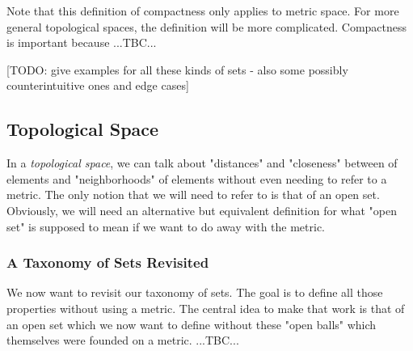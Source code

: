 \medskip
Note that this definition of compactness only applies to metric space. For more general topological spaces, the definition will be more complicated. Compactness is important because ...TBC...

[TODO: give examples for all these kinds of sets - also some possibly counterintuitive ones and edge cases]









\subsection{Topological Space}
In a \emph{topological space}, we can talk about "distances" and "closeness" between of elements and "neighborhoods" of elements without even needing to refer to a metric. The only notion that we will need to refer to is that of an open set. Obviously, we will need an alternative but equivalent definition for what "open set" is supposed to mean if we want to do away with the metric.



\subsubsection{A Taxonomy of Sets Revisited}
We now want to revisit our taxonomy of sets. The goal is to define all those properties without using a metric. The central idea to make that work is that of an open set which we now want to define without these "open balls" which themselves were founded on a metric. ...TBC...

